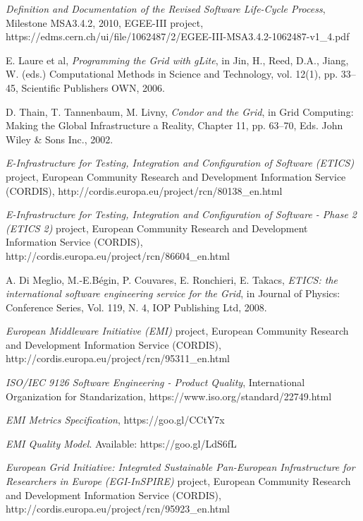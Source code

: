 \documentclass[journal]{IEEEtran}
\begin{document}
\begin{thebibliography}{1}
\emph{Definition and Documentation of the Revised Software Life-Cycle Process},
Milestone MSA3.4.2, 2010, EGEE-III project,
https://edms.cern.ch/ui/file/1062487/2/EGEE-III-MSA3.4.2-1062487-v1\_4.pdf

E. Laure et al, \emph{Programming the Grid with gLite}, in Jin, H., Reed, D.A.,
Jiang, W. (eds.) Computational Methods in Science and Technology, vol. 12(1),
pp. 33–45, Scientific Publishers OWN, 2006.

D. Thain, T. Tannenbaum, M. Livny, \emph{Condor and the Grid}, in Grid
Computing: Making the Global Infrastructure a Reality, Chapter 11, pp. 63–70,
Eds. John Wiley \& Sons Inc., 2002.

\emph{E-Infrastructure for Testing, Integration and Configuration of Software
(ETICS)} project, European Community Research and Development Information
Service (CORDIS), http://cordis.europa.eu/project/rcn/80138\_en.html

\emph{E-Infrastructure for Testing, Integration and Configuration of Software -
Phase 2 (ETICS 2)} project, European Community Research and Development
Information Service (CORDIS),
http://cordis.europa.eu/project/rcn/86604\_en.html

A. Di Meglio, M.-E.Bégin, P. Couvares, E. Ronchieri, E. Takacs, \emph{ETICS:
the international software engineering service for the Grid}, in Journal of
Physics: Conference Series, Vol. 119, N. 4, IOP Publishing Ltd, 2008.

\emph{European Middleware Initiative (EMI)} project, European Community
Research and Development Information Service (CORDIS),
http://cordis.europa.eu/project/rcn/95311\_en.html

\emph{ISO/IEC 9126 Software Engineering - Product Quality}, International
Organization for Standarization, https://www.iso.org/standard/22749.html

\emph{EMI Metrics Specification}, https://goo.gl/CCtY7x


\emph{EMI Quality Model}. Available: https://goo.gl/LdS6fL

\emph{European Grid Initiative: Integrated Sustainable Pan-European
Infrastructure for Researchers in Europe (EGI-InSPIRE)} project, European
Community Research and Development Information Service (CORDIS),
http://cordis.europa.eu/project/rcn/95923\_en.html


\end{thebibliography}
\end{document}
